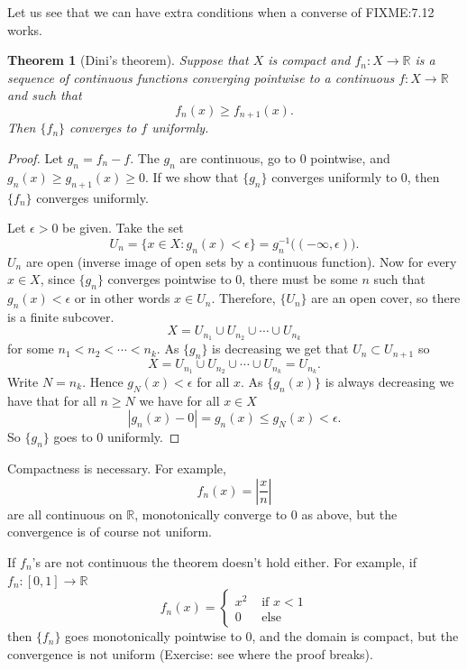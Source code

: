 \documentclass[12pt]{book}
\newcommand{\abs}[1]{\left\lvert {#1} \right\rvert}
\newcommand{\R}{{\mathbb{R}}}
\theoremstyle{plain}
\newtheorem{thm}{Theorem}[section]
\theoremstyle{remark}
\theoremstyle{definition}
\theoremstyle{exercise}
\theoremstyle{example}
\begin{document}
Let us see that we can have extra conditions when a converse of FIXME:7.12 works.

\begin{thm}[Dini's theorem]
Suppose that $X$ is compact and $f_n \colon X \to \R$ is a sequence of
continuous functions converging pointwise to a continuous $f \colon X \to
\R$ and such that
\begin{equation*}
f_n(x) \geq f_{n+1}(x).
\end{equation*}
Then
$\{ f_n \}$ converges to $f$ uniformly.
\end{thm}

\begin{proof}
Let $g_n = f_n-f$.  The $g_n$ are continuous, go to 0 pointwise, and
$g_n(x) \geq g_{n+1}(x) \geq 0$.  If we show that $\{ g_n \}$ converges
uniformly to 0, then $\{ f_n \}$ converges uniformly.

Let $\epsilon > 0$ be given.
Take the set
\begin{equation*}
U_n = \{ x \in X : g_n(x) < \epsilon \} =
g_n^{-1}\bigl((-\infty,\epsilon)\bigr).
\end{equation*}
$U_n$ are open (inverse image of open sets by a continuous function).  Now for every $x \in X$,
since $\{g_n\}$ converges pointwise to 0, there must be some $n$ such that
$g_n(x) < \epsilon$ or in other words $x \in U_n$.  Therefore, $\{ U_n \}$
are an open cover, so there is a finite subcover.
$$
X = U_{n_1} \cup U_{n_2} \cup \cdots \cup U_{n_k}
$$
for some $n_1 < n_2 < \cdots < n_k$.  As $\{g_n\}$ is decreasing
we get that $U_n \subset U_{n+1}$ so
$$
X = U_{n_1} \cup U_{n_2} \cup \cdots \cup U_{n_k} = U_{n_k} .
$$
Write $N = n_k$.  Hence
$g_N(x) < \epsilon$ for all $x$.  As $\{ g_n(x) \}$ is always
decreasing we have that for all $n \geq N$ we have for all $x \in X$
\begin{equation*}
\abs{g_n(x) - 0}
=
g_n(x) \leq g_N(x) < \epsilon .
\end{equation*}
So $\{ g_n \}$ goes to 0 uniformly.
\end{proof}

Compactness is necessary.  For example,
\begin{equation*}
f_n(x) = \abs{\frac{x}{n}}
\end{equation*}
are all continuous on $\R$, monotonically converge to 0 as above, but
the convergence is of course not uniform.

If $f_n$'s are not continuous the theorem doesn't hold either.  For example,
if $f_n \colon [0,1] \to \R$
\begin{equation*}
f_n(x) = \begin{cases}
x^2 & \text{ if $x < 1$}\\
0 & \text{ else}
\end{cases}
\end{equation*}
then $\{f_n\}$ goes monotonically pointwise to 0, and the domain is compact, but the convergence is not
uniform (Exercise: see where the proof breaks).
\end{document}
